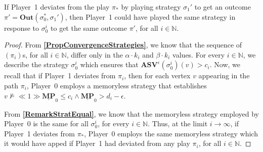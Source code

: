 \begin{proposition}
    \label{PropContradictionPlayEnforcable}
    If Player~1 deviates from the play $\pi_*$ by playing strategy $\sigma_1'$ to get an outcome $\pi' = \mathbf{Out}(\sigma_0^*, \sigma_1')$, then Player~1 could have played the same strategy in response to $\sigma_0^i$ to get the same outcome $\pi'$, for all $i \in \mathbb{N}$. 
\end{proposition}
\begin{proof}
    From \textbf{\cref{PropConvergenceStrategies}}, we know that the sequence of $(\pi_i)$s, for all $i \in \mathbb{N}$, differ only in the $\alpha \cdot k_i$ and $\beta \cdot k_i$ values.
    For every $i \in \mathbb{N}$, we describe the strategy $\sigma_0^i$ which ensures that $\mathbf{ASV}^{\epsilon}(\sigma_0^i)(v) > c_i$. Now, we recall that if Player~1 deviates from $\pi_i$, then for each vertex $v$ appearing in the path $\pi_i$, Player~0 employs a memoryless strategy that establishes $v \nvDash \ll 1 \gg \underline{\mathbf{MP}}_0 \leqslant c_i \land \underline{\mathbf{MP}}_0 > d_i - \epsilon$.

    From \textbf{\cref{RemarkStratEqual}}, we know that the memoryless strategy employed by Player~0 is the same for all $\sigma_0^i$, for every $i \in \mathbb{N}$. Thus, at the limit $i \to \infty$, if Player~1 deviates from $\pi_*$, Player~0 employs the same memoryless strategy which it would have apped if Player~1 had deviated from any play $\pi_i$, for all $i \in \mathbb{N}$.
\end{proof}

